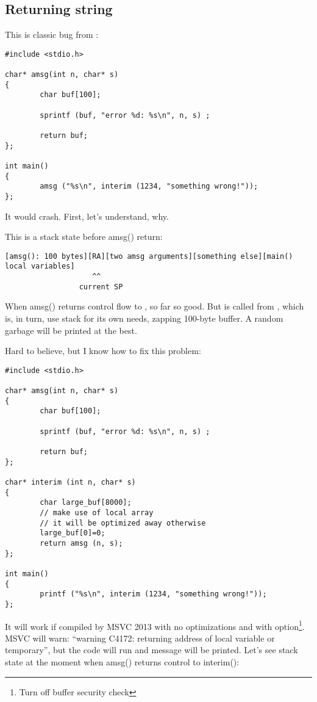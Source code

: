\subsection{Returning string}

This is classic bug from \RobPikePractice{}:

\begin{lstlisting}
#include <stdio.h>

char* amsg(int n, char* s)
{
        char buf[100];

        sprintf (buf, "error %d: %s\n", n, s) ;

        return buf;
};

int main()
{
        amsg ("%s\n", interim (1234, "something wrong!"));
};
\end{lstlisting}

It would crash.
First, let's understand, why.

This is a stack state before amsg() return:

\begin{lstlisting}
[amsg(): 100 bytes][RA][two amsg arguments][something else][main() local variables]
                    ^^
                 current SP
\end{lstlisting}

When amsg() returns control flow to \main, so far so good.
But \printf is called from \main, which is, in turn, use stack for its own needs, zapping 100-byte buffer.
A random garbage will be printed at the best.

Hard to believe, but I know how to fix this problem:

\begin{lstlisting}
#include <stdio.h>

char* amsg(int n, char* s)
{
        char buf[100];

        sprintf (buf, "error %d: %s\n", n, s) ;

        return buf;
};

char* interim (int n, char* s)
{
        char large_buf[8000];
        // make use of local array
        // it will be optimized away otherwise
        large_buf[0]=0;
        return amsg (n, s);
};

int main()
{
        printf ("%s\n", interim (1234, "something wrong!"));
};
\end{lstlisting}

It will work if compiled by MSVC 2013 with no optimizations and with  option\footnote{Turn off buffer security check}.
MSVC will warn: ``warning C4172: returning address of local variable or temporary'', but the code will run and message
will be printed.
Let's see stack state at the moment when amsg() returns control to interim():

